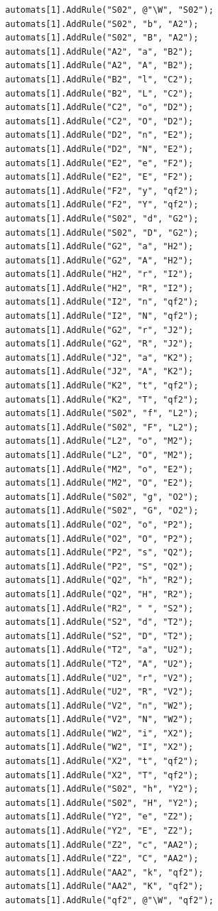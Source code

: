 \documentclass[a4paper,10pt]{article}
\begin{document}
\begin{lstlisting}
		automats[1].AddRule("S02", @"\W", "S02");
		automats[1].AddRule("S02", "b", "A2");
		automats[1].AddRule("S02", "B", "A2");
		automats[1].AddRule("A2", "a", "B2");
		automats[1].AddRule("A2", "A", "B2");
		automats[1].AddRule("B2", "l", "C2");
		automats[1].AddRule("B2", "L", "C2");
		automats[1].AddRule("C2", "o", "D2");
		automats[1].AddRule("C2", "O", "D2");
		automats[1].AddRule("D2", "n", "E2");
		automats[1].AddRule("D2", "N", "E2");
		automats[1].AddRule("E2", "e", "F2");
		automats[1].AddRule("E2", "E", "F2");
		automats[1].AddRule("F2", "y", "qf2");
		automats[1].AddRule("F2", "Y", "qf2");
		automats[1].AddRule("S02", "d", "G2");
		automats[1].AddRule("S02", "D", "G2");
		automats[1].AddRule("G2", "a", "H2");
		automats[1].AddRule("G2", "A", "H2");
		automats[1].AddRule("H2", "r", "I2");
		automats[1].AddRule("H2", "R", "I2");
		automats[1].AddRule("I2", "n", "qf2");
		automats[1].AddRule("I2", "N", "qf2");
		automats[1].AddRule("G2", "r", "J2");
		automats[1].AddRule("G2", "R", "J2");
		automats[1].AddRule("J2", "a", "K2");
		automats[1].AddRule("J2", "A", "K2");
		automats[1].AddRule("K2", "t", "qf2");
		automats[1].AddRule("K2", "T", "qf2");
		automats[1].AddRule("S02", "f", "L2");
		automats[1].AddRule("S02", "F", "L2");
		automats[1].AddRule("L2", "o", "M2");
		automats[1].AddRule("L2", "O", "M2");
		automats[1].AddRule("M2", "o", "E2");
		automats[1].AddRule("M2", "O", "E2");
		automats[1].AddRule("S02", "g", "O2");
		automats[1].AddRule("S02", "G", "O2");
		automats[1].AddRule("O2", "o", "P2");
		automats[1].AddRule("O2", "O", "P2");
		automats[1].AddRule("P2", "s", "Q2");
		automats[1].AddRule("P2", "S", "Q2");
		automats[1].AddRule("Q2", "h", "R2");
		automats[1].AddRule("Q2", "H", "R2");
		automats[1].AddRule("R2", " ", "S2");
		automats[1].AddRule("S2", "d", "T2");
		automats[1].AddRule("S2", "D", "T2");
		automats[1].AddRule("T2", "a", "U2");
		automats[1].AddRule("T2", "A", "U2");
		automats[1].AddRule("U2", "r", "V2");
		automats[1].AddRule("U2", "R", "V2");
		automats[1].AddRule("V2", "n", "W2");
		automats[1].AddRule("V2", "N", "W2");
		automats[1].AddRule("W2", "i", "X2");
		automats[1].AddRule("W2", "I", "X2");
		automats[1].AddRule("X2", "t", "qf2");
		automats[1].AddRule("X2", "T", "qf2");
		automats[1].AddRule("S02", "h", "Y2");
		automats[1].AddRule("S02", "H", "Y2");
		automats[1].AddRule("Y2", "e", "Z2");
		automats[1].AddRule("Y2", "E", "Z2");
		automats[1].AddRule("Z2", "c", "AA2");
		automats[1].AddRule("Z2", "C", "AA2");
		automats[1].AddRule("AA2", "k", "qf2");
		automats[1].AddRule("AA2", "K", "qf2");
		automats[1].AddRule("qf2", @"\W", "qf2");
		

\end{lstlisting}
\end{document}
